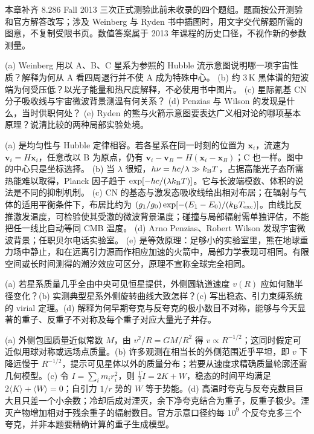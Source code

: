 本章补齐 8.286 Fall 2013 三次正式测验此前未收录的四个题组。题面按公开测验和官方解答改写；涉及 Weinberg 与 Ryden 书中插图时，用文字交代解题所需的图意，不复制受限书页。数值答案属于 2013 年课程的历史口径，不视作新的参数测量。

\begin{exercise}
(a) Weinberg 用以 A、B、C 星系为参照的 Hubble 流示意图说明哪一项宇宙性质？解释为何从 A 看四周退行并不使 A 成为特殊中心。
(b) 约 $3\,\mathrm K$ 黑体谱的短波端为何受压低？以光子能量和热尺度解释，不必使用书中图片。
(c) 星际氰基 CN 分子吸收线与宇宙微波背景测温有何关系？
(d) Penzias 与 Wilson 的发现是什么，当时供职何处？
(e) Ryden 的熊与火箭示意图要表达广义相对论的哪项基本原理？说清比较的两种局部实验处境。
\end{exercise}
\begin{solution}
(a) 是均匀性与 Hubble 定律相容。若各星系在同一时刻的位置为 $\boldsymbol x_i$，流速为 $\boldsymbol v_i=H\boldsymbol x_i$，任意改以 B 为原点，仍有 $\boldsymbol v_i-\boldsymbol v_B=H(\boldsymbol x_i-\boldsymbol x_B)$；C 也一样。图中的中心只是坐标选择。
(b) 当 $\lambda$ 很短，$h\nu=hc/\lambda\gg k_{\mathrm B} T$，占据高能光子态所需热能难以取得，Planck 因子趋于 $\exp[-hc/(\lambda k_{\mathrm B} T)]$。它与长波端模数、体积的说法是不同的抑制机制。
(c) CN 的基态与激发态吸收线给出相对布居；在辐射与气体的适用平衡条件下，布居比约为 $(g_1/g_0)\exp[-(E_1-E_0)/(k_{\mathrm B} T_{\rm exc})]$。由线比反推激发温度，可检验使其受激的微波背景温度；碰撞与局部辐射需单独评估，不能把任一线比自动等同 CMB 温度。
(d) Arno Penzias、Robert Wilson 发现宇宙微波背景；任职贝尔电话实验室。
(e) 是等效原理：足够小的实验室里，熊在地球重力场中静止，和在远离引力源而作相应加速的火箭中，局部力学表现可相同。有限空间或长时间测得的潮汐效应可区分，原理不宣称全球完全相同。
\end{solution}

\begin{exercise}
(a) 若星系质量几乎全由中央可见恒星提供，外侧圆轨道速度 $v(R)$ 应如何随半径变化？(b) 实测典型星系外侧旋转曲线大致怎样？(c) 写出稳态、引力束缚系统的 virial 定理。(d) 解释为何早期夸克与反夸克的极小数目不对称，能够与今天显著的重子、反重子不对称及每个重子对应大量光子并存。
\end{exercise}
\begin{solution}
(a) 外侧包围质量近似常数 $M$，由 $v^2/R=GM/R^2$ 得 $v\propto R^{-1/2}$；这同时假定可近似用球对称或远场点质量。(b) 许多观测在相当长的外侧范围近乎平坦，即 $v$ 下降远慢于 $R^{-1/2}$，提示可见星体以外的质量分布；若要从速度求精确质量轮廓还需几何模型。(c) 令 $I=\sum_i m_i r_i^2$，则 $\tfrac12\ddot I=2K+W$，稳态的时间平均满足 $2\langle K\rangle+\langle W\rangle=0$；自引力 $1/r$ 势的 $W$ 等于势能。(d) 高温时夸克与反夸克数目巨大且只差一个小余数；冷却后成对湮灭，余下净夸克结合为重子，反重子极少。湮灭产物增加相对于残余重子的辐射数目。官方示意口径约每 $10^9$ 个反夸克多三个夸克，并非本题要精确计算的重子生成模型。
\end{solution}

